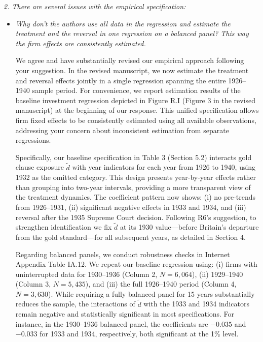 \noindent \textit{\textcolor{red!60!black}{2. There are several issues with the empirical specification:}}
\bigskip

\begin{itemize}
    \item[\textit{\textcolor{red!60!black}{a.}}] \textit{\textcolor{red!60!black}{
    Why don't the authors use all data in the regression and estimate the treatment and the reversal in one regression on a balanced panel? This way the firm effects are consistently estimated.
    }}

    \bigskip

    \noindent We agree and have substantially revised our empirical approach following your suggestion. In the revised manuscript, we now estimate the treatment and reversal effects jointly in a single regression spanning the entire 1926--1940 sample period. For convenience, we report estimation results of the baseline investment regression depicted in Figure R.I (Figure 3 in the revised manuscript) at the beginning of our response. This unified specification allows firm fixed effects to be consistently estimated using all available observations, addressing your concern about inconsistent estimation from separate regressions.
    
    Specifically, our baseline specification in Table 3 (Section 5.2) interacts gold clause exposure $\tilde{d}$ with year indicators for each year from 1926 to 1940, using 1932 as the omitted category. This design presents year-by-year effects rather than grouping into two-year intervals, providing a more transparent view of the treatment dynamics. The coefficient pattern now shows: (i) no pre-trends from 1926--1931, (ii) significant negative effects in 1933 and 1934, and (iii) reversal after the 1935 Supreme Court decision. Following R6's suggestion, to strengthen identification we fix $\tilde{d}$ at its 1930 value---before Britain's departure from the gold standard---for all subsequent years, as detailed in Section 4.
    
    Regarding balanced panels, we conduct robustness checks in Internet Appendix Table IA.12. We repeat our baseline regression using: (i) firms with uninterrupted data for 1930--1936 (Column 2, $N = 6,064$), (ii) 1929--1940 (Column 3, $N = 5,435$), and (iii) the full 1926--1940 period (Column 4, $N = 3,630$). While requiring a fully balanced panel for 15 years substantially reduces the sample, the interactions of $\tilde{d}$ with the 1933 and 1934 indicators remain negative and statistically significant in most specifications. For instance, in the 1930--1936 balanced panel, the coefficients are $-0.035$ and $-0.033$ for 1933 and 1934, respectively, both significant at the 1\% level.
    

\end{itemize}
